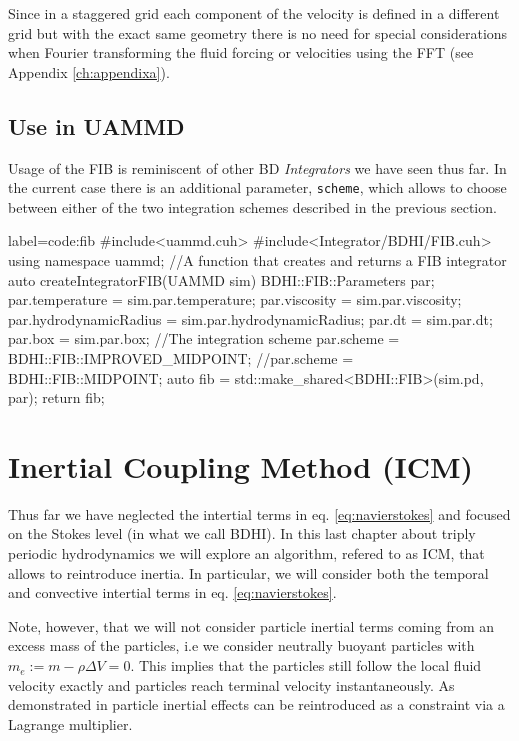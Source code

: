 \documentclass[ twoside,openright,titlepage,numbers=noenddot,%
headinclude,footinclude,cleardoublepage=empty,abstract=on,
BCOR=5mm,paper=a4,fontsize=11pt, dvipsnames
]{scrreprt}
\def\ucpp{uammd_cpp_lexer.py:UAMMDCppLexer -x}
\begin{document}
Since in a staggered grid each component of the velocity is defined in a different grid but with the exact same geometry there is no need for special considerations when Fourier transforming the fluid forcing or velocities using the \gls{FFT} (see Appendix \ref{ch:appendixa}).
\subsection*{Use in UAMMD}
Usage of the \gls{FIB} is reminiscent of other \gls{BD} \emph{Integrators} we have seen thus far. In the current case there is an additional parameter, \texttt{scheme}, which allows to choose between either of the two integration schemes described in the previous section.

\begin{code2}{label=code:fib}
#include<uammd.cuh>
#include<Integrator/BDHI/FIB.cuh>
using namespace uammd;
//A function that creates and returns a FIB integrator
auto createIntegratorFIB(UAMMD sim){   
  BDHI::FIB::Parameters par;
  par.temperature = sim.par.temperature;
  par.viscosity = sim.par.viscosity;
  par.hydrodynamicRadius = sim.par.hydrodynamicRadius;
  par.dt = sim.par.dt;  
  par.box = sim.par.box;
  //The integration scheme
  par.scheme = BDHI::FIB::IMPROVED_MIDPOINT;
  //par.scheme = BDHI::FIB::MIDPOINT;
  auto fib = std::make_shared<BDHI::FIB>(sim.pd, par);
  return fib;
}
\end{code2}





\section{Inertial Coupling Method (ICM)}\label{ch:icm}
Thus far we have neglected the intertial terms in eq. \eqref{eq:navierstokes} and focused on the Stokes level (in what we call \gls{BDHI}). In this last chapter about triply periodic hydrodynamics we will explore an algorithm, refered to as \gls{ICM}\cite{Balboa2014}, that allows to reintroduce inertia. In particular, we will consider both the temporal and convective intertial terms in eq. \eqref{eq:navierstokes}.

Note, however, that we will not consider particle inertial terms coming from an excess mass of the particles, i.e we consider neutrally buoyant particles with $m_e := m - \rho\Delta V = 0$. This implies that the particles still follow the local fluid velocity exactly and particles reach terminal velocity instantaneously. As demonstrated in \cite{Balboa2014} particle inertial effects can be reintroduced as a constraint via a Lagrange multiplier.
\end{document}
